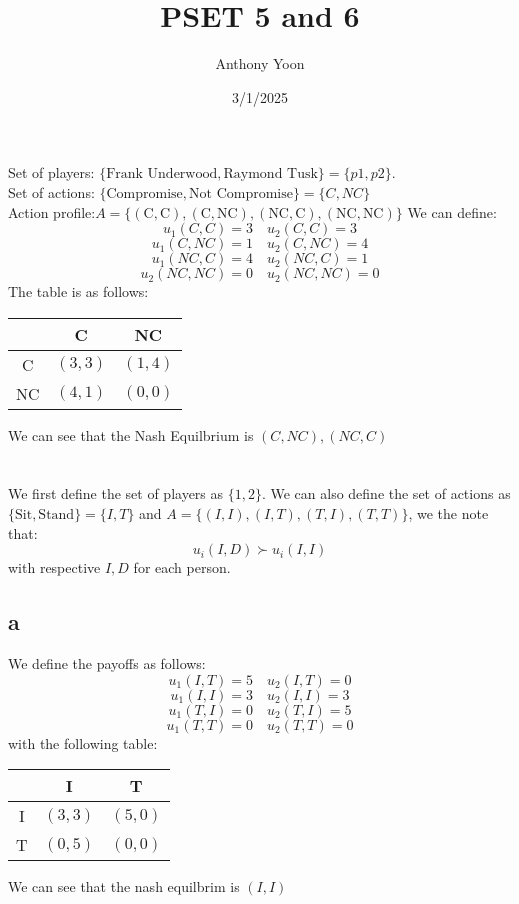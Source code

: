 \documentclass[11pt]{article}
\title{PSET 5 and 6}
\author{Anthony Yoon}
\date{3/1/2025}
\begin{document}
\maketitle
\section{}
Set of players: $\{ \text{Frank Underwood}, \text{Raymond Tusk}\} = \{p1, p2\}$.\\ 
Set of actions: $\{\text{Compromise}, \text{Not Compromise}\} = \{ C, NC\}$ \\
Action profile:$A = \{ (\text{C}, \text{C}),(\text{C}, \text{NC}), (\text{NC}, \text{C}), (\text{NC}, \text{NC})\}$
We can define:
\[
u_1(C, C) = 3 \quad u_2(C,C) = 3 
\]
\[
u_1(C, NC) = 1 \quad u_2(C, NC) = 4
\]
\[
u_1(NC, C) = 4 \quad u_2(NC, C) = 1
\]
\[
u_2(NC, NC) = 0 \quad u_2(NC, NC) = 0
\]
The table is as follows:
\begin{table}[H]
    \centering 
    \begin{tabular}{c|c|c}
        & C & NC\\
        \hline
        C & $(3,3)$ & $(1,4)$\\
        NC & $(4,1)$ & $(0,0)$ 
    \end{tabular}
\end{table}
\noindent We can see that the Nash Equilbrium is $(C, NC), (NC, C)$
\newpage
\section{}
We first define the set of players as $\{1,2\}$. We can also define the set of actions as $\{ \text{Sit}, \text{Stand} \} =\{I, T\}$ and $A = \{ (I, I), (I, T), (T, I), (T,T)\}$, we the note that:
\[
u_i(I, D) \succ u_i(I, I)
\] 
with respective $I, D$ for each person. 
\subsection*{a}
We define the payoffs as follows:
\[
u_1(I, T) = 5 \quad u_2(I,T) = 0
\]
\[
u_1(I, I) = 3 \quad u_2(I, I) = 3
\]
\[
u_1(T, I) = 0 \quad u_2(T, I) = 5
\]
\[
u_1(T, T) = 0 \quad u_2(T,T) = 0
\]
with the following table:
\begin{table}[H]
    \centering 
    \begin{tabular}{c|c|c}
        & I & T\\
        \hline
        I & $(3,3)$ & $(5,0)$\\
        T & $(0,5)$ & $(0,0)$ 
    \end{tabular}
\end{table}
\noindent We can see that the nash equilbrim is $(I,I)$
\end{document}
